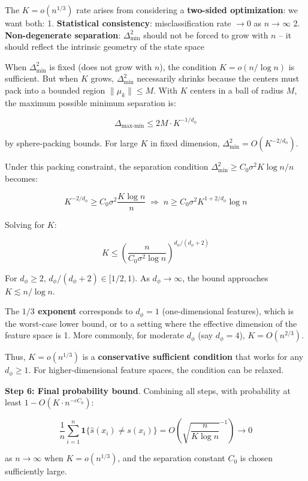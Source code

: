 \documentclass[
  12pt,
]{article}
\begin{document}
The \(K = o(n^{1/3})\) rate arises from considering a \textbf{two-sided
optimization}: we want both: 1. \textbf{Statistical consistency}:
misclassification rate \(\to 0\) as \(n \to \infty\) 2.
\textbf{Non-degenerate separation}: \(\Delta_{\min}^2\) should not be
forced to grow with \(n\) -- it should reflect the intrinsic geometry of
the state space

When \(\Delta_{\min}^2\) is fixed (does not grow with \(n\)), the
condition \(K = o(n / \log n)\) is sufficient. But when \(K\) grows,
\(\Delta_{\min}^2\) necessarily shrinks because the centers must pack
into a bounded region \(\|\mu_k\| \leq M\). With \(K\) centers in a ball
of radius \(M\), the maximum possible minimum separation is:

\[\Delta_{\max\text{-min}} \leq 2M \cdot K^{-1/d_\phi}\]

by sphere-packing bounds. For large \(K\) in fixed dimension,
\(\Delta_{\min}^2 = O(K^{-2/d_\phi})\).

Under this packing constraint, the separation condition
\(\Delta_{\min}^2 \geq C_0 \sigma^2 K \log n / n\) becomes:

\[K^{-2/d_\phi} \geq C_0 \sigma^2 \frac{K \log n}{n} \;\Longrightarrow\; n \geq C_0 \sigma^2 K^{1 + 2/d_\phi} \log n\]

Solving for \(K\):

\[K \leq \left(\frac{n}{C_0 \sigma^2 \log n}\right)^{d_\phi/(d_\phi + 2)}\]

For \(d_\phi \geq 2\), \(d_\phi/(d_\phi + 2) \in [1/2, 1)\). As
\(d_\phi \to \infty\), the bound approaches \(K \lesssim n / \log n\).

The \textbf{\(1/3\) exponent} corresponds to \(d_\phi = 1\)
(one-dimensional features), which is the worst-case lower bound, or to a
setting where the effective dimension of the feature space is 1. More
commonly, for moderate \(d_\phi\) (say \(d_\phi = 4\)),
\(K = O(n^{2/3})\).

Thus, \(K = o(n^{1/3})\) is a \textbf{conservative sufficient condition}
that works for any \(d_\phi \geq 1\). For higher-dimensional feature
spaces, the condition can be relaxed.

\textbf{Step 6: Final probability bound}. Combining all steps, with
probability at least \(1 - O(K \cdot n^{-c C_0})\):

\[\frac{1}{n} \sum_{i=1}^n \mathbf{1}\{\hat{s}(x_i) \neq s(x_i)\} = O\left(\sqrt{\frac{n}{K \log n}}^{-1}\right) \to 0\]

as \(n \to \infty\) when \(K = o(n^{1/3})\), and the separation constant
\(C_0\) is chosen sufficiently large.
\end{document}
